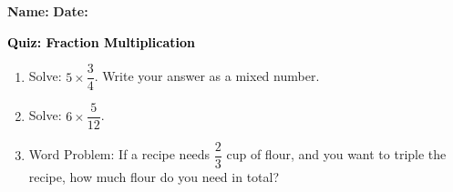 \documentclass[12pt, letterpaper, fleqn]{article}
\begin{document}
\textbf{Name:} \underline{\hspace{5cm}}
\hfill
\textbf{Date:} \underline{\hspace{3cm}}\\

\begin{tcolorbox}[colback=customteal!20]
    \large\textcolor{black}{\textbf{Quiz: Fraction Multiplication}}
\end{tcolorbox}
\begin{enumerate}[itemsep=3.5cm, leftmargin=0.6cm]
\item Solve: $5 \times \dfrac{3}{4}$. Write your answer as a mixed number.
\vspace{3.5cm}
\item Solve: $6 \times \dfrac{5}{12}$.
\vspace{3.5cm}
\item Word Problem: If a recipe needs $\dfrac{2}{3}$ cup of flour, and you want to triple the recipe, how much flour do you need in total?
\end{enumerate}
\end{document}
